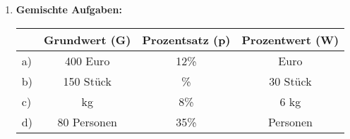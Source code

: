 \begin{enumerate}[label=\arabic*., resume]
    \vspace{1cm}

    \item \textbf{Gemischte Aufgaben:}

    \vspace{0.5cm}

    \begin{center}
        \begin{tabular}{|l|c|c|c|}
            \hline
            & Grundwert (G) & Prozentsatz (p) & Prozentwert (W) \\
            \hline
            a) & 400 Euro & 12\% & \phantom{00} Euro \\
            \hline
            b) & 150 Stück & \phantom{00}\% & 30 Stück \\
            \hline
            c) & \phantom{000} kg & 8\% & 6 kg \\
            \hline
            d) & 80 Personen & 35\% & \phantom{00} Personen \\
            \hline
        \end{tabular}
    \end{center}

\end{enumerate}